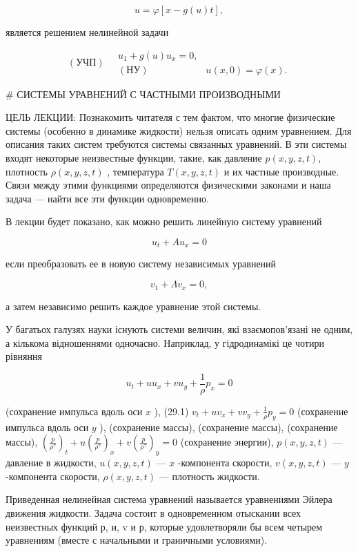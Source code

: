 \documentclass[
  ukrainian,
]{article}
\begin{document}
\[
u = \varphi[x - g(u) t],
\]

является решением нелинейной задачи

\[
(\text{УЧП}) \quad \begin{aligned} u_1 + g(u) u_x = 0, \\ (\text{НУ}) & u(x, 0) = \varphi(x). \end{aligned}
\]

\# СИСТЕМЫ УРАВНЕНИЙ С ЧАСТНЫМИ ПРОИЗВОДНЫМИ

ЦЕЛЬ ЛЕКЦИИ: Познакомить читателя с тем фактом, что многие физические
системы (особенно в динамике жидкости) нельзя описать одним уравнением.
Для описания таких систем требуются системы связанных уравнений. В эти
системы входят некоторые неизвестные функции, такие, как давление
\(p(x, y, z, t)\), плотность \(\rho(x, y, z, t)\) , температура
\(T(x, y, z, t)\) и их частные производные. Связи между этими функциями
определяются физическими законами и наша задача --- найти все эти
функции одновременно.

В лекции будет показано, как можно решить линейную систему уравнений

\[
u_t + Au_x = 0
\]

если преобразовать ее в новую систему независимых уравнений

\[
v_1 + \Lambda v_x = 0,
\]

а затем независимо решить каждое уравнение этой системы.

У багатьох галузях науки існують системи величин, які взаємопов'язані не
одним, а кількома відношеннями одночасно. Наприклад, у гідродинамікі це
чотири рівняння

\[
u_t + uu_x + vu_y + \frac{1}{\rho} p_x = 0
\]

(сохранение импульса вдоль оси \(x\) ), (29.1)
\(v_t + uv_x + vv_y + \frac{1}{\rho} p_y = 0\) (сохранение импульса
вдоль оси \(y\) ), (сохранение массы), (сохранение массы), (сохранение
массы),
\(\left(\frac{p}{\rho^{\gamma}}\right)_t + u\left(\frac{p}{\rho^{\gamma}}\right)_x + v\left(\frac{p}{\rho^{\gamma}}\right)_y = 0\)
(сохранение энергии), \(p(x, y, z, t)\) --- давление в жидкости,
\(u(x, y, z, t)\) --- \(x\) -компонента скорости, \(v(x, y, z, t)\) ---
\(y\) -компонента скорости, \(\rho(x, y, z, t)\) --- плотность жидкости.

Приведенная нелинейная система уравнений называется уравнениями Эйлера
движения жидкости. Задача состоит в одновременном отыскании всех
неизвестных функций р, и, v и р, которые удовлетворяли бы всем четырем
уравнениям (вместе с начальными и граничными условиями).
\end{document}
